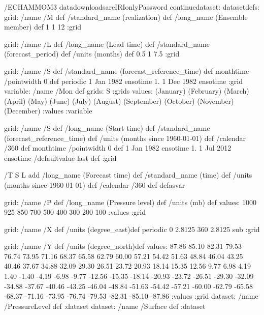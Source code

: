 \begin{ingrid}
/ECHAMMOM3 datadownloadsareIRIonlyPassword
continuedataset:
datasetdefs:
grid:
/name /M def
/standard_name (realization) def
/long_name (Ensemble member) def
1 1 12
:grid


grid:
/name /L def
/long_name (Lead time) def
/standard_name (forecast_period) def
/units (months) def
0.5 1 7.5
:grid

grid:
/name /S def
/standard_name (forecast_reference_time) def
monthtime
/pointwidth 0 def
periodic
1 Jan 1982 ensotime
1.
1 Dec 1982 ensotime
:grid
variable:
/name /Mon def
grids: S :grids
values:
(January)
(February)
(March)
(April)
(May)
(June)
(July)
(August)
(September)
(October)
(November)
(December)
:values
:variable

grid:
/name /S def
/long_name (Start time) def
/standard_name (forecast_reference_time) def
/units (months since 1960-01-01) def
/calendar /360 def
monthtime
/pointwidth 0 def 
1 Jan 1982 ensotime
1.
1 Jul 2012 ensotime
/defaultvalue {last} def
:grid

/T { 
S L add
/long_name (Forecast time) def
/standard_name (time) def
/units (months since 1960-01-01) def
/calendar /360 def
 }defasvar


grid:
/name /P def
/long_name (Pressure level) def
/units (mb) def
values: 
1000 925 850 700 500 400 300 200 100 
:values
:grid

grid:
/name /X def
/units (degree_east)def
 periodic
 0 2.8125 360  2.8125 sub
:grid

grid:
/name /Y def
/units (degree_north)def
values:
87.86 85.10 82.31 79.53 76.74 73.95 71.16 68.37
 65.58 62.79 60.00 57.21 54.42 51.63 48.84 46.04 43.25 40.46
 37.67 34.88 32.09 29.30 26.51 23.72 20.93 18.14 15.35 12.56
 9.77  6.98  4.19  1.40   -1.40   -4.19   -6.98   -9.77  -12.56  -15.35
 -18.14  -20.93  -23.72  -26.51  -29.30  -32.09  -34.88  -37.67  -40.46  -43.25
 -46.04  -48.84  -51.63  -54.42  -57.21  -60.00  -62.79  -65.58  -68.37  -71.16
 -73.95  -76.74  -79.53  -82.31  -85.10  -87.86
:values
:grid
dataset: /name /PressureLevel def :dataset
dataset: /name /Surface def :dataset



\end{ingrid}
